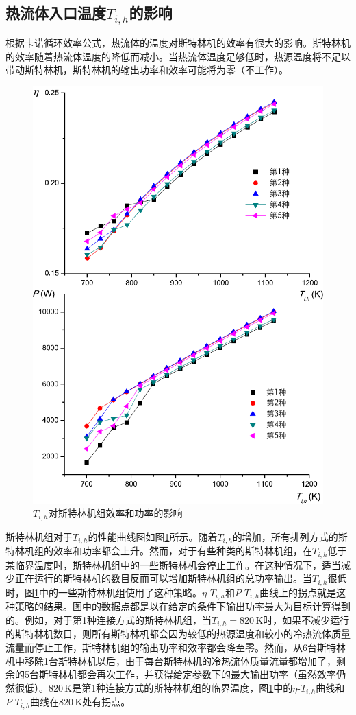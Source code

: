 \subsection{热流体入口温度$T_{i,h}$的影响}
\label{sec:T_i_h}
根据卡诺循环效率公式，热流体的温度对斯特林机的效率有很大的影响。斯特林机的效率随着热流体温度的降低而减小。当热流体温度足够低时，热源温度将不足以带动斯特林机，斯特林机的输出功率和效率可能将为零（不工作）。
\begin{figure}[htpb]
\begin{center}
	\includegraphics[width = 0.7\columnwidth]{fig/T_ih}
	\caption{$T_{i,h}$对斯特林机组效率和功率的影响}
	\label{fig:Ti_h}
\end{center}
\end{figure}
斯特林机组对于$T_{i,h}$的性能曲线图如图\ref{fig:Ti_h}所示。随着$T_{i,h}$的增加，所有排列方式的斯特林机组的效率和功率都会上升。然而，对于有些种类的斯特林机组，在$T_{i,h}$低于某临界温度时，斯特林机组中的一些斯特林机会停止工作。在这种情况下，适当减少正在运行的斯特林机的数目反而可以增加斯特林机组的总功率输出。当$T_{i,h}$很低时，图\ref{fig:Ti_h}中的一些斯特林机组使用了这种策略。$\eta$-$T_{i,h}$和$P$-$T_{i,h}$曲线上的拐点就是这种策略的结果。图中的数据点都是以在给定的条件下输出功率最大为目标计算得到的。例如，对于第1种连接方式的斯特林机组，当$T_{i,h} = 820\,\mathrm{K}$时，如果不减少运行的斯特林机数目，则所有斯特林机都会因为较低的热源温度和较小的冷热流体质量流量而停止工作，斯特林机组的输出功率和效率都会降至零。然而，从6台斯特林机中移除1台斯特林机以后，由于每台斯特林机的冷热流体质量流量都增加了，剩余的5台斯特林机都会再次工作，并获得给定参数下的最大输出功率（虽然效率仍然很低）。$820\,\mathrm{K}$是第1种连接方式的斯特林机组的临界温度，图\ref{fig:Ti_h}中的$\eta$-$T_{i,h}$曲线和$P$-$T_{i,h}$曲线在$820\,\mathrm{K}$处有拐点。

